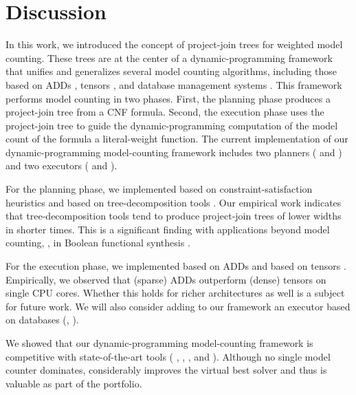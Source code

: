 





\section{Discussion}
\label{sec_discussion}

In this work, we introduced the concept of project-join trees for weighted model counting.
These trees are at the center of a dynamic-programming framework that unifies and generalizes several model counting algorithms, including those based on ADDs \cite{dudek2020addmc}, tensors \cite{dudek2019efficient}, and database management systems \cite{fichte2020exploiting}.
This framework performs model counting in two phases.
First, the planning phase produces a project-join tree from a CNF formula.
Second, the execution phase uses the project-join tree to guide the dynamic-programming computation of the model count of the formula \wrt{} a literal-weight function.
The current implementation of our dynamic-programming model-counting framework \Dpmc{} includes two planners (\Htb{} and \Lg) and two executors (\Dmc{} and \Tensor{}).

For the planning phase, we implemented \Htb{} based on constraint-satisfaction heuristics
\cite{tarjan1984simple,koster2001treewidth,dechter2003constraint,dechter1999bucket,bouquet1999gestion}
and \Lg{} based on tree-decomposition tools \cite{strasser2017computing,tamaki2019positive,abseher2017htd}.
Our empirical work indicates that tree-decomposition tools tend to produce project-join trees of lower widths in shorter times.
This is a significant finding with applications beyond model counting, \eg, in Boolean functional synthesis \cite{tabajara2017factored}.

For the execution phase, we implemented \Dmc{} based on ADDs \cite{dudek2020addmc,somenzi2015cudd} and \Tensor{} based on tensors \cite{dudek2019efficient,numpy}.
Empirically, we observed that (sparse) ADDs outperform (dense) tensors on single CPU cores.
Whether this holds for richer architectures as well is a subject for future work.
We will also consider adding to our framework an executor based on databases (\eg, \cite{fichte2020exploiting}).

We showed that our dynamic-programming model-counting framework \Dpmc{} is competitive with state-of-the-art tools (\cachet{} \cite{sang2004combining}, \ctd{} \cite{darwiche2004new}, \df{} \cite{lagniez2017improved}, and \minictd{} \cite{oztok2015top}).
Although no single model counter dominates,
\Dpmc{} considerably improves the virtual best solver and thus is valuable as part of the portfolio.

